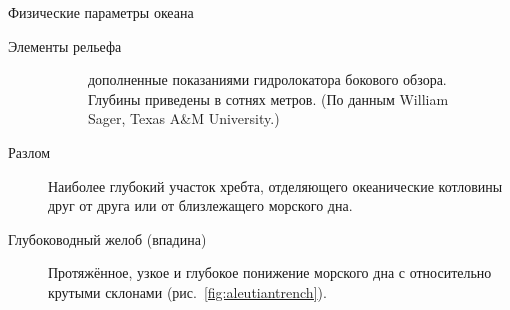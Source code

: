\begin{chapter}{Физические параметры океана}
\begin{section}{Элементы рельефа}
\begin{description}
\begin{figure}[t!]
{дополненные показаниями гидролокатора бокового обзора. Глубины приведены в
сотнях метров. (По данным William Sager, Texas A\&M University.)}
\label{fig:wildeguyot}
\vspace{-3ex}
\end{figure}
%

\item[Разлом]
Наиболее глубокий участок хребта, отделяющего океанические котловины друг от 
друга или от близлежащего морского дна.
%

\item[Глубоководный желоб (впадина)]
Протяжённое, узкое и глубокое понижение морского дна с относительно
крутыми склонами (рис.~\ref{fig:aleutiantrench}).
%


\end{description}
\end{section}
\end{chapter}
